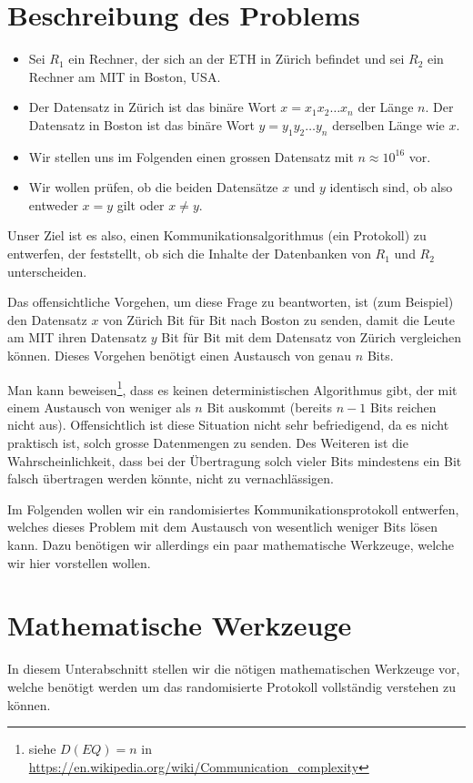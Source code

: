 \section{Beschreibung des Problems}
\begin{itemize}
	\item Sei $R_1$ ein Rechner, der sich an der ETH in Zürich befindet und sei $R_2$ ein Rechner am MIT in Boston, USA.
	\item Der Datensatz in Zürich ist das binäre Wort $x = x_1x_2\ldots x_n$ der Länge $n$. Der Datensatz in Boston ist das binäre Wort $y = y_1y_2\ldots y_n$ derselben Länge wie $x$.
	\item Wir stellen uns im Folgenden einen grossen Datensatz mit $n \approx 10^{16}$ vor.
	\item Wir wollen prüfen, ob die beiden Datensätze $x$ und $y$ identisch sind, ob also entweder $x=y$ gilt oder $x\neq y$.
\end{itemize}
Unser Ziel ist es also, einen Kommunikationsalgorithmus (ein Protokoll) zu
entwerfen, der feststellt, ob sich die Inhalte der Datenbanken von $R_1$ und $R_2$ unterscheiden.

\begin{myremark}
	Das offensichtliche Vorgehen, um diese Frage zu beantworten, ist (zum Beispiel) den Datensatz $x$ von Zürich Bit für Bit nach Boston zu senden, damit die Leute am MIT ihren Datensatz $y$ Bit für Bit mit dem Datensatz von Zürich vergleichen können.
	Dieses Vorgehen benötigt einen Austausch von genau $n$ Bits.

	Man kann beweisen\footnote{siehe $D(EQ) = n$ in \url{https://en.wikipedia.org/wiki/Communication_complexity}}, dass es keinen deterministischen Algorithmus gibt, der mit einem Austausch von weniger als $n$ Bit auskommt (bereits $n-1$ Bits reichen nicht aus).
	Offensichtlich ist diese Situation nicht sehr befriedigend, da es nicht praktisch ist, solch grosse Datenmengen zu senden.
	Des Weiteren ist die Wahrscheinlichkeit, dass bei der Übertragung solch vieler Bits mindestens ein Bit falsch übertragen werden könnte, nicht zu vernachlässigen.
\end{myremark}

Im Folgenden wollen wir ein randomisiertes Kommunikationsprotokoll entwerfen, welches dieses Problem mit dem Austausch von wesentlich weniger Bits lösen kann.
Dazu benötigen wir allerdings ein paar mathematische Werkzeuge, welche wir hier vorstellen wollen.

\section{Mathematische Werkzeuge}
In diesem Unterabschnitt stellen wir die nötigen mathematischen Werkzeuge vor, welche benötigt werden um das randomisierte Protokoll vollständig verstehen zu können.

